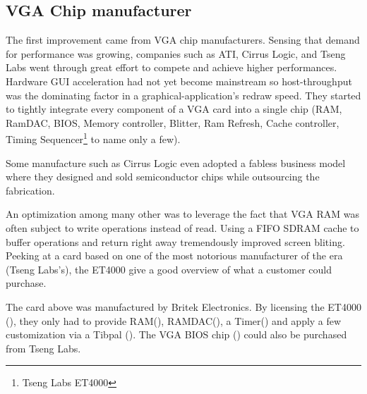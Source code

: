 \subsection{VGA Chip manufacturer}
The first improvement came from VGA chip manufacturers. Sensing that demand for performance was growing, companies such as ATI, Cirrus Logic, and Tseng Labs went through great effort to compete and achieve higher performances. Hardware GUI acceleration had not yet become mainstream so host-throughput was the dominating factor in a graphical-application's redraw speed. They started to tightly integrate every component of a VGA card into a single chip (RAM, RamDAC, BIOS, Memory controller, Blitter, Ram Refresh, Cache controller, Timing Sequencer\footnote{Tseng Labs ET4000} to name only a few).\\
\par
Some manufacture such as Cirrus Logic even adopted a fabless business model where they designed and sold semiconductor chips while outsourcing the fabrication.


An optimization among many other was to leverage the fact that VGA RAM was often subject to write operations instead of read. Using a FIFO SDRAM cache to buffer operations and return right away tremendously improved screen bliting. Peeking at a card based on one of the most notorious manufacturer of the era (Tseng Labs's), the ET4000 give a good overview of what a customer could purchase.\\ 
\par
{}
\par
The card above was manufactured by Britek Electronics. By licensing the ET4000 (), they only had to provide RAM(), RAMDAC(), a Timer() and apply a few customization via a Tibpal (). The VGA BIOS chip () could also be purchased from Tseng Labs.\\
\par
{}

\par



